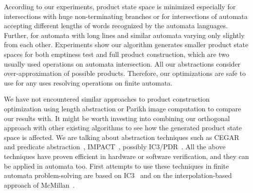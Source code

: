 According to our experiments, product state space is minimized especially for intersections with huge non-terminating branches or for intersections of automata accepting different lengths of words recognized by the automata languages. Further, for automata with long lines and similar automata varying only slightly from each other. Experiments show our algorithm generates smaller product state spaces for both emptiness test and full product construction, which are two usually used operations on automata intersection. All our abstractions consider over-approximation of possible products. Therefore, our optimizations are safe to use for any uses resolving operations on finite automata.

We have not encountered similar approaches to product construction optimization using length abstraction or Parikh image computation to compare our results with. It might be worth investing into combining our orthogonal approach with other existing algorithms to see how the generated product state space is affected. We are talking about abstraction techniques such as CEGAR~\cite{DBLP:conf/cav/ClarkeGJLV00} and predicate abstraction~\cite{DBLP:conf/cav/ColonU98, DBLP:conf/cav/GrafS97}, IMPACT~\cite{DBLP:conf/cav/McMillan06}, possibly IC3/PDR~\cite{DBLP:conf/sat/HoderB12, DBLP:conf/fmcad/BradleyM07}. All the above techniques have proven efficient in hardware or software verification, and they can be applied in automata too. First attempts to use these techniques in finite automata problem-solving are based on IC3~\cite{DBLP:journals/pacmpl/HolikJLRV18, DBLP:conf/cav/WangTLYJ16, DBLP:journals/corr/abs-1708-09073} and on the interpolation-based approach of McMillan~\cite{DBLP:conf/tacas/AmlaM07, DBLP:conf/tacas/GangeNSSS13}.

